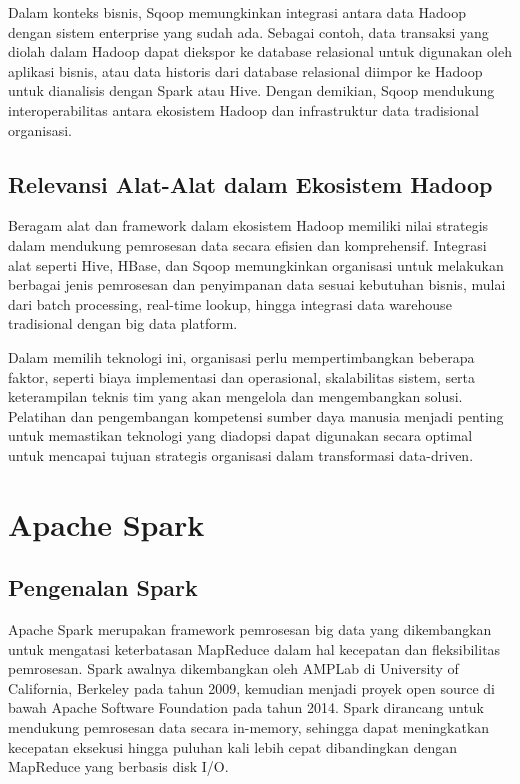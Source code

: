 Dalam konteks bisnis, Sqoop memungkinkan integrasi antara data Hadoop dengan sistem enterprise yang sudah ada. Sebagai contoh, data transaksi yang diolah dalam Hadoop dapat diekspor ke database relasional untuk digunakan oleh aplikasi bisnis, atau data historis dari database relasional diimpor ke Hadoop untuk dianalisis dengan Spark atau Hive. Dengan demikian, Sqoop mendukung interoperabilitas antara ekosistem Hadoop dan infrastruktur data tradisional organisasi.

\subsection{Relevansi Alat-Alat dalam Ekosistem Hadoop}


Beragam alat dan framework dalam ekosistem Hadoop memiliki nilai strategis dalam mendukung pemrosesan data secara efisien dan komprehensif. Integrasi alat seperti Hive, HBase, dan Sqoop memungkinkan organisasi untuk melakukan berbagai jenis pemrosesan dan penyimpanan data sesuai kebutuhan bisnis, mulai dari batch processing, real-time lookup, hingga integrasi data warehouse tradisional dengan big data platform.

Dalam memilih teknologi ini, organisasi perlu mempertimbangkan beberapa faktor, seperti biaya implementasi dan operasional, skalabilitas sistem, serta keterampilan teknis tim yang akan mengelola dan mengembangkan solusi. Pelatihan dan pengembangan kompetensi sumber daya manusia menjadi penting untuk memastikan teknologi yang diadopsi dapat digunakan secara optimal untuk mencapai tujuan strategis organisasi dalam transformasi data-driven.


\section{Apache Spark}

\subsection{Pengenalan Spark}

Apache Spark merupakan framework pemrosesan big data yang dikembangkan untuk mengatasi keterbatasan MapReduce dalam hal kecepatan dan fleksibilitas pemrosesan. Spark awalnya dikembangkan oleh AMPLab di University of California, Berkeley pada tahun 2009, kemudian menjadi proyek open source di bawah Apache Software Foundation pada tahun 2014. Spark dirancang untuk mendukung pemrosesan data secara in-memory, sehingga dapat meningkatkan kecepatan eksekusi hingga puluhan kali lebih cepat dibandingkan dengan MapReduce yang berbasis disk I/O.

